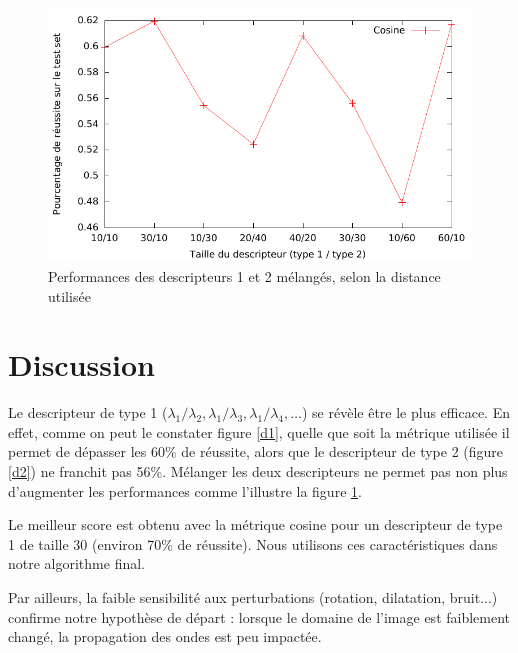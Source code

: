 \documentclass[a4paper,10pt]{article} %
\theoremstyle{definition} %
\begin{document}
\begin{figure}[H]
  \includegraphics[scale=1.15]{../plot/courbe3.pdf}
\caption{Performances des descripteurs 1 et 2 mélangés, selon la distance utilisée}
\label{d3}
\end{figure}


\section{Discussion}

Le descripteur de type 1 ($\lambda_1/\lambda_2, \lambda_1/\lambda_3, \lambda_1/\lambda_4, \dots$) se révèle être le plus efficace. En effet, comme on peut le constater figure \ref{d1}, quelle que soit la métrique utilisée il permet de dépasser les 60\% de réussite, alors que le descripteur de type 2 (figure \ref{d2}) ne franchit pas 56\%. Mélanger les deux descripteurs ne permet pas non plus d'augmenter les performances comme l'illustre la figure \ref{d3}.

Le meilleur score est obtenu avec la métrique cosine pour un descripteur de type 1 de taille 30 (environ 70\% de réussite). Nous utilisons ces caractéristiques dans notre algorithme final.

Par ailleurs, la faible sensibilité aux perturbations (rotation, dilatation, bruit...) confirme notre hypothèse de départ : lorsque le domaine de l'image est faiblement changé, la propagation des ondes est peu impactée.
\end{document}
